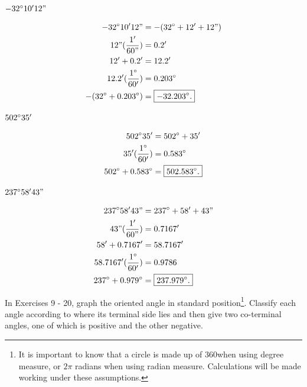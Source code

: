 \documentclass[10pt,letterpaper]{amspset}
\begin{document}
\begin{problem} [6.]
    $ -32\degree 10' 12"$
\end{problem}

\begin{solution}[Solution]
\begin{align}
    -32\degree 10' 12" &= - (32\degree + 12' + 12") \\
    12" (\frac{1'}{60"}) &= 0.2' \\
    12' + 0.2' &= 12.2' \\
    12.2' (\frac{1\degree}{60'}) &= 0.203\degree \\
    -(32\degree + 0.203\degree) &= \boxed{-32.203\degree.} 
\end{align}
\end{solution}


\begin{problem} [7.]
    $ 502\degree 35'$
\end{problem}

\begin{solution}[Solution]
\begin{align}
    502\degree 35' &= 502\degree + 35' \\
    35' (\frac{1\degree}{60'}) &= 0.583\degree \\
    502\degree + 0.583\degree &= \boxed{502.583\degree.}
\end{align}
\end{solution}


\begin{problem} [8.]
    $ 237\degree 58' 43"$
\end{problem}

\begin{solution}[Solution]
\begin{align}
    237\degree 58' 43" &= 237\degree + 58' + 43"\\
    43" (\frac{1'}{60"}) &= 0.7167' \\
    58' + 0.7167' &= 58.7167' \\
    58.7167' (\frac{1\degree}{60'}) &= 0.9786 \\
    237\degree + 0.979\degree &= \boxed{237.979\degree.}
\end{align}
\end{solution}

\pagebreak

In Exercises 9 - 20, graph the oriented angle in standard position\footnote{It is important to know that a circle is made up of 360\degree when using degree measure, or $2\pi$ radians when using radian measure. Calculations will be made working under these assumptions.}. Classify each angle according to where its terminal side lies and then give two co-terminal angles, one of which is positive and the other negative. 
\end{document}
